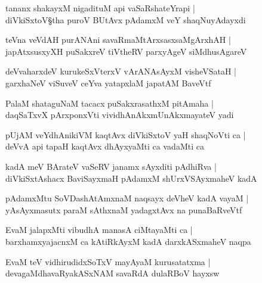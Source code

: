 \begin{shloka}
tananx shakayxM nigadituM api vaSaRshateYrapi |\\
diVkiSxtoV\S tha puroV BUtAvx pAdamxM veY shaqNuyAdayxdi 
\end{shloka}

\begin{shloka}
teVna veVdAH purANAni savaRmaMtArxsasxsaMgArxhAH |\\
japAtxsusxyXH puSakxreV tiVtheRV parxyAgeV siMdhusAgareV
\end{shloka}

\begin{shloka}
deVvaharxdeV kurukeSxVterxV vArANAsAyxM visheVSataH |\\
garxhaNeV viSuveV ceYva yatapxlaM japatAM BaveVtf
\end{shloka}

\begin{shloka}
PalaM shataguNaM tacacx puSakxrasathxM pitAmaha |\\
daqSaTxvX pArxponxVti vividhAnAkxmUnAkxmayateV yadi
\end{shloka}

\begin{shloka}
pUjAM veYdhAnikiVM kaqtAvx diVkiSxtoV yaH shaqNoVti ca |\\
deVvA api tapaH kaqtAvx dhAyxyaMti ca vadaMti ca 
\end{shloka}

\begin{shloka}
kadA meV BArateV vaSeRV janamx sAyxditi pAdhiRva |\\
diVkiSxtAshacx BaviSayxmaH pAdamxM shUrxVSAyxmaheV kadA 
\end{shloka}

\begin{shloka}
pAdamxMtu SoVDashAtAmxnaM naqsayx deVheV kadA vayaM |\\
yAsAyxmasutx paraM sAthxnaM yadagxtAvx na punaBaRveVtf 
\end{shloka}

\begin{shloka}
EvaM jalapxMti vibudhA manasA ciMtayaMti ca |\\
barxhamxyajacnxM ca kAtiRkAyxM kadA darxkASxmaheV naqpa
\end{shloka}

\begin{shloka}
EvaM teV vidhirudidxSoTxV mayAyaM kurusatatxma |\\
devagaMdhavaRyakASxNAM savaRdA dulaRBoV hayxsw
\end{shloka}

